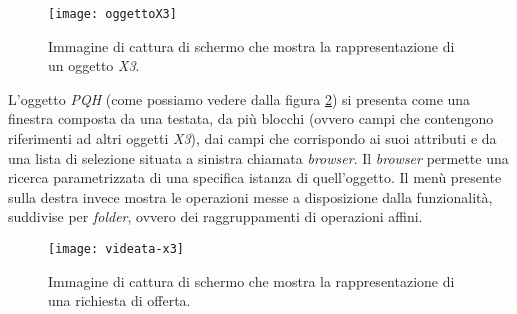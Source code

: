 \begin{figure}[htbp]
	\begin{center}
		\texttt{[image: oggettoX3]}
		\caption{Immagine di cattura di schermo che mostra la rappresentazione di un oggetto \textit{X3}.}
		\label{fig:oggetto-x3}
	\end{center}
\end{figure}

\newpage
L'oggetto \textit{PQH} (come possiamo vedere dalla figura \ref{fig:pqh-x3}) si presenta come una finestra composta da una testata, da più blocchi (ovvero campi che contengono riferimenti ad altri oggetti \textit{X3}), dai campi che corrispondo ai suoi attributi e da una lista di selezione situata a sinistra chiamata \textit{browser}. Il \textit{browser} permette una ricerca parametrizzata di una specifica istanza di quell'oggetto. Il menù presente sulla destra invece mostra le operazioni messe a disposizione dalla funzionalità, suddivise per \textit{folder}, ovvero dei raggruppamenti di operazioni affini.

\begin{figure}[htbp]
	\begin{center}
		\texttt{[image: videata-x3]}
		\caption{Immagine di cattura di schermo che mostra la rappresentazione di una richiesta di offerta.}
		\label{fig:pqh-x3}
	\end{center}
\end{figure}


